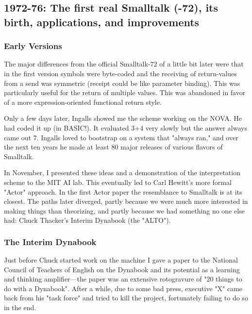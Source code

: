 \documentclass[letterpaper,12pt,parskip=full]{article}
\begin{document}
\subsection{1972-76: The first real Smalltalk (-72), its birth, applications, and improvements}

\subsubsection{Early Versions}

 The major differences from the official Smalltalk-72 of a little bit later were that in the first version symbols were byte-coded and the receiving of return-values from a send was symmetric (receipt could be like parameter binding). This was particularly useful for the return of multiple values. This was abandoned in favor of a more expression-oriented functional return style.

Only a few days later, Ingalls showed me the scheme working on the NOVA. He had coded it up (in BASIC!). It evaluated 3+4 very slowly but the answer always came out 7. Ingalls loved to bootstrap on a system that "always ran," and over the next ten years he made at least 80 major releases of various flavors of Smalltalk.

In November, I presented these ideas and a demonstration of the interpretation scheme to the MIT AI lab. This eventually led to Carl Hewitt's more formal "Actor" approach. In the first Actor paper the resemblance to Smalltalk is at its closest. The paths later diverged, partly because we were much more interested in making things than theorizing, and partly because we had something no one else had: Chuck Thacker's Interim Dynabook (the "ALTO").

\subsubsection{The Interim Dynabook}

Just before Chuck started work on the machine I gave a paper to the National Council of Teachers of English on the Dynabook and its potential as a learning and thinking amplifier—the paper was an extensive rotogravure of "20 things to do with a Dynabook". After a while, due to some bad press, executive "X" came back from his "task force" and tried to kill the project, fortunately failing to do so in the end.
\end{document}

